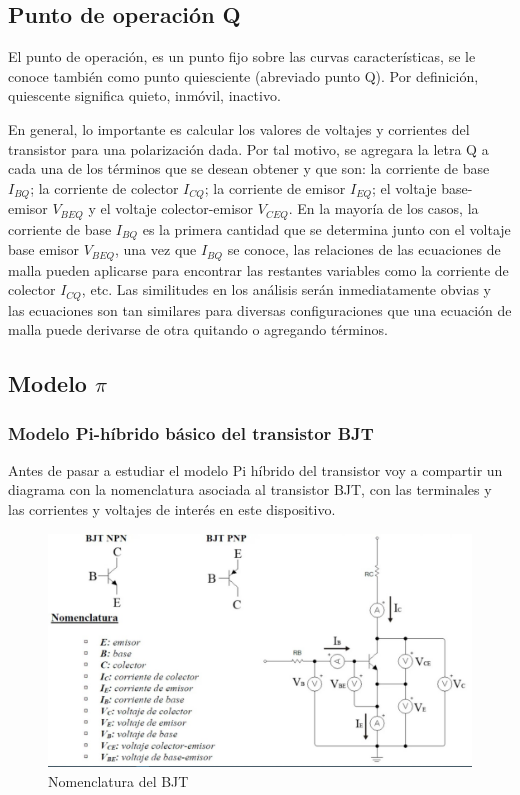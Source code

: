 \subsection{Punto de operación Q}

El punto de operación, es un punto fijo sobre las curvas características, se le conoce también como punto quiesciente (abreviado punto Q). Por definición, quiescente significa quieto, inmóvil, inactivo.

En general, lo importante es calcular los valores de voltajes y corrientes del transistor para una polarización dada. Por tal motivo, se agregara la letra Q a cada
una de los términos que se desean obtener y que son: la corriente de base $I_{BQ}$; la corriente de colector $I_{CQ}$; la corriente de emisor $I_{EQ}$; el voltaje base-emisor $V_{BEQ}$ y el voltaje colector-emisor $V_{CEQ}$. En la mayoría de los casos, la corriente de base $I_{BQ}$ es la primera cantidad que se determina junto con el voltaje base emisor $V_{BEQ}$, una vez que $I_{BQ}$ se conoce, las relaciones de las ecuaciones de malla pueden aplicarse para encontrar las restantes variables como la corriente de colector $I_{CQ}$, etc. Las similitudes en los análisis serán inmediatamente obvias y
las ecuaciones son tan similares para diversas configuraciones que una ecuación
de malla puede derivarse de otra quitando o agregando términos.

\subsection{\texorpdfstring{Modelo $\pi$}{Modelo pi}} %


\subsubsection{Modelo Pi-híbrido básico del transistor BJT}
Antes de pasar a estudiar el modelo Pi híbrido del transistor voy a compartir un diagrama con la nomenclatura asociada al transistor BJT, con las terminales y las corrientes y voltajes de interés en este dispositivo.

\begin{figure}[H]
    \centering
    \includegraphics[width=\textwidth]{Imagenes/bjt.jpg}
    \caption{Nomenclatura del BJT}
    \label{fig:bjt}
\end{figure}

